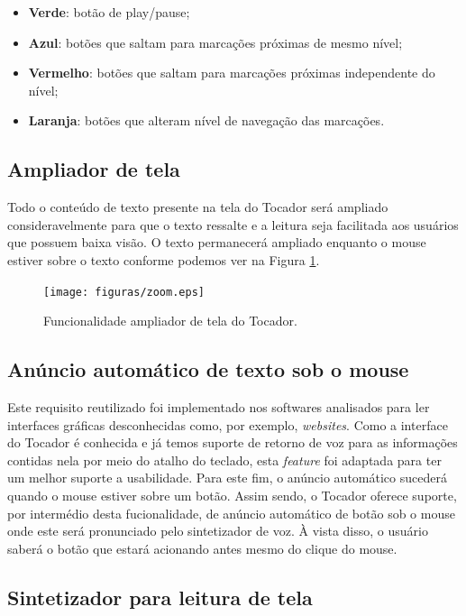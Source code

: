 \begin{itemize}
	\item{\textbf{Verde}:} botão de play/pause;
	\item{\textbf{Azul}:} botões que saltam para marcações próximas de mesmo nível;
	\item{\textbf{Vermelho}:} botões que saltam para marcações próximas independente do nível;
	\item{\textbf{Laranja}:} botões que alteram nível de navegação das marcações.
\end{itemize}

\subsection{Ampliador de tela}

Todo o conteúdo de texto presente na tela do Tocador será ampliado consideravelmente para que o texto ressalte e a leitura seja facilitada aos usuários que possuem baixa visão. O texto permanecerá ampliado enquanto o mouse estiver sobre o texto conforme podemos ver na Figura \ref{zoom}.

 \begin{figure}[ht]
	\centering
		\texttt{[image: figuras/zoom.eps]}
	\caption{Funcionalidade ampliador de tela do Tocador.}
	\label{zoom}
\end{figure}

\subsection{Anúncio automático de texto sob o mouse}

Este requisito reutilizado foi implementado nos softwares analisados para ler interfaces gráficas desconhecidas como, por exemplo, \textit{websites}. Como a interface do Tocador é conhecida e já temos suporte de retorno de voz para as informações contidas nela por meio do atalho do teclado, esta \textit{feature} foi adaptada para ter um melhor suporte a usabilidade. Para este fim, o anúncio automático sucederá quando o mouse estiver sobre um botão. Assim sendo, o Tocador oferece suporte, por intermédio desta fucionalidade, de anúncio automático de botão sob o mouse onde este será pronunciado pelo sintetizador de voz. À vista disso, o usuário saberá o botão que estará acionando antes mesmo do clique do mouse.

\subsection{Sintetizador para leitura de tela}

